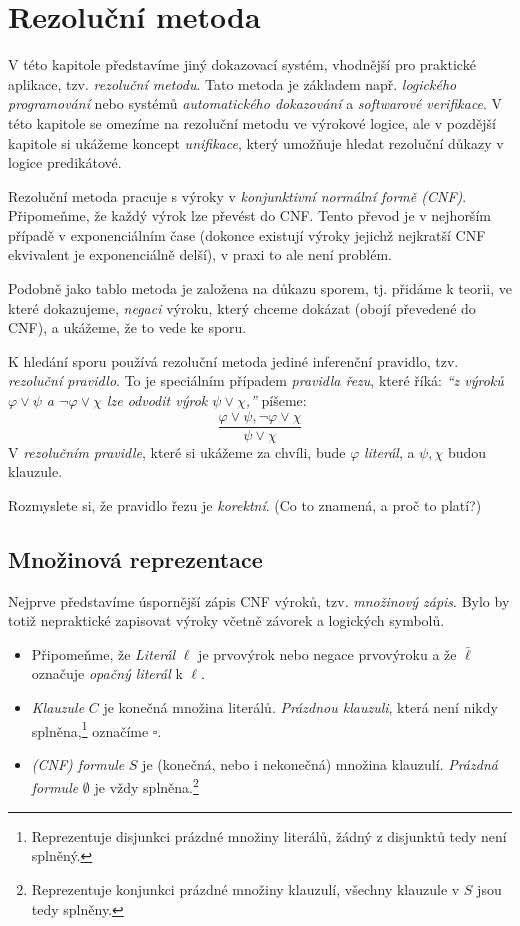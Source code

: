 \chapter{Rezoluční metoda}\label{chapter:propositional-resolution}

V této kapitole představíme jiný dokazovací systém, vhodnější pro praktické aplikace,  tzv. \emph{rezoluční metodu}. Tato metoda je základem např. \emph{logického programování} nebo systémů \emph{automatického dokazování} a \emph{softwarové verifikace}. V této kapitole se omezíme na rezoluční metodu ve výrokové logice, ale v pozdější kapitole si ukážeme koncept \emph{unifikace}, který umožňuje hledat rezoluční důkazy v logice predikátové.

Rezoluční metoda pracuje s výroky v \emph{konjunktivní normální formě (CNF)}. Připomeňme, že každý výrok lze převést do CNF. Tento převod je v nejhorším případě v exponenciálním čase (dokonce existují výroky jejichž nejkratší CNF ekvivalent je exponenciálně delší), v praxi to ale není problém.

Podobně jako tablo metoda je založena na důkazu sporem, tj. přidáme k teorii, ve které dokazujeme, \emph{negaci} výroku, který chceme dokázat (obojí převedené do CNF), a ukážeme, že to vede ke sporu.

K hledání sporu používá rezoluční metoda jediné inferenční pravidlo, tzv. \emph{rezoluční pravidlo}. To je speciálním případem \emph{pravidla řezu}, které říká: \emph{``z výroků $\varphi\lor\psi$ a $\neg\varphi\lor\chi$ lze odvodit výrok $\psi\lor\chi$,''} píšeme:
$$
\frac{\varphi\lor\psi,\neg\varphi\lor\chi}{\psi\lor\chi}
$$
V \emph{rezolučním pravidle}, které si ukážeme za chvíli, bude $\varphi$ \emph{literál}, a $\psi,\chi$ budou {klauzule}. 

\begin{exercise}
Rozmyslete si, že pravidlo řezu je \emph{korektní}. (Co to znamená, a proč to platí?)
\end{exercise}

\section{Množinová reprezentace}

Nejprve představíme úspornější zápis CNF výroků, tzv. \emph{množinový zápis}. Bylo by totiž nepraktické zapisovat výroky včetně závorek a logických symbolů.
\begin{itemize}
    \item Připomeňme, že \emph{Literál} $\ell$ je prvovýrok nebo negace prvovýroku  a že $\bar \ell$ označuje \emph{opačný literál} k $\ell$.
    \item \emph{Klauzule} $C$ je konečná množina literálů. \emph{Prázdnou klauzuli}, která není nikdy splněna,\footnote{Reprezentuje disjunkci prázdné množiny literálů, žádný z disjunktů tedy není splněný.} označíme $\square$.
    \item \emph{(CNF) formule} $S$ je (konečná, nebo i nekonečná) množina klauzulí. \emph{Prázdná formule} $\emptyset$ je vždy splněna.\footnote{Reprezentuje konjunkci prázdné množiny klauzulí, všechny klauzule v $S$ jsou tedy splněny.}
\end{itemize}

